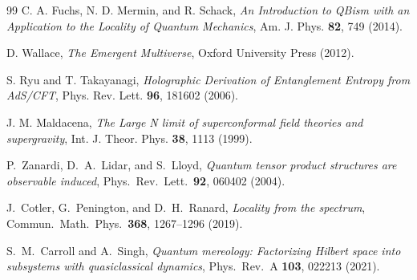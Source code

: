 \documentclass[12pt,a4paper]{article}
\begin{document}
\begin{thebibliography}{99}
C. A. Fuchs, N. D. Mermin, and R. Schack, \emph{An Introduction to QBism with an Application to the Locality of Quantum Mechanics}, Am. J. Phys. \textbf{82}, 749 (2014).

D. Wallace, \emph{The Emergent Multiverse}, Oxford University Press (2012).

S. Ryu and T. Takayanagi, \emph{Holographic Derivation of Entanglement Entropy from AdS/CFT}, Phys. Rev. Lett. \textbf{96}, 181602 (2006).

J. M. Maldacena, \emph{The Large N limit of superconformal field theories and supergravity}, Int. J. Theor. Phys. \textbf{38}, 1113 (1999).

P.~Zanardi, D.~A.~Lidar, and S.~Lloyd,
\emph{Quantum tensor product structures are observable induced},
Phys.\ Rev.\ Lett.\ \textbf{92}, 060402 (2004).

J.~Cotler, G.~Penington, and D.~H.~Ranard,
\emph{Locality from the spectrum},
Commun.\ Math.\ Phys.\ \textbf{368}, 1267--1296 (2019).

S.~M.~Carroll and A.~Singh,
\emph{Quantum mereology: Factorizing Hilbert space into subsystems with quasiclassical dynamics},
Phys.\ Rev.\ A \textbf{103}, 022213 (2021).

\end{thebibliography}
\end{document}
